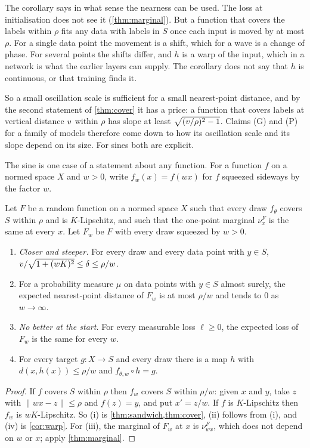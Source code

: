 The corollary says in what sense the nearness can be used. The loss at
initialisation does not see it (\cref{thm:marginal}). But a function that
covers the labels within $\rho$ fits any data with labels in $S$ once each
input is moved by at most $\rho$. For a single data point the movement is a
shift, which for a wave is a change of phase. For several points the shifts
differ, and $h$ is a warp of the input, which in a network is what the earlier
layers can supply. The corollary does not say that $h$ is continuous, or that
training finds it.

So a small oscillation scale is sufficient for a small nearest-point distance,
and by the second statement of \cref{thm:cover} it has a price: a function that covers labels at
vertical distance $v$ within $\rho$ has slope at least
$\sqrt{(v/\rho)^2-1}$. Claims (G) and (P) for a family of models therefore
come down to how its oscillation scale and its slope depend on its size. For
sines both are explicit.

The sine is one case of a statement about any function. For a function $f$ on
a normed space $X$ and $w>0$, write $f_w(x)=f(wx)$ for $f$ squeezed sideways by
the factor $w$.

\begin{theorem}\label{thm:general}
Let $F$ be a random function on a normed space $X$ such that every draw
$f_\theta$ covers $S$ within $\rho$ and is $K$-Lipschitz, and such that the
one-point marginal $\nu^F_x$ is the same at every $x$. Let $F_w$ be $F$ with
every draw squeezed by $w>0$.
\begin{enumerate}\setlength{\itemsep}{0pt}
\item[(i)] \emph{Closer and steeper.} For every draw and every data point with
$y\in S$,
$v/\sqrt{1+(wK)^2}\le\delta\le\rho/w$.
\item[(ii)] For a probability measure $\mu$ on data points with $y\in S$ almost
surely, the expected nearest-point distance of $F_w$ is at most $\rho/w$ and
tends to $0$ as $w\to\infty$.
\item[(iii)] \emph{No better at the start.} For every measurable loss
$\ell\ge0$, the expected loss of $F_w$ is the same for every $w$.
\item[(iv)] For every target $g:X\to S$ and every draw there is a map $h$ with
$d(x,h(x))\le\rho/w$ and $f_{\theta,w}\circ h=g$.
\end{enumerate}
\end{theorem}

\begin{proof}
If $f$ covers $S$ within $\rho$ then $f_w$ covers $S$ within $\rho/w$: given
$x$ and $y$, take $z$ with $\|wx-z\|\le\rho$ and $f(z)=y$, and put $x'=z/w$.
If $f$ is $K$-Lipschitz then $f_w$ is $wK$-Lipschitz. So (i) is
\cref{thm:sandwich,thm:cover}, (ii) follows from (i), and (iv) is
\cref{cor:warp}. For (iii), the marginal of $F_w$ at $x$ is $\nu^F_{wx}$, which
does not depend on $w$ or $x$; apply \cref{thm:marginal}.
\end{proof}

